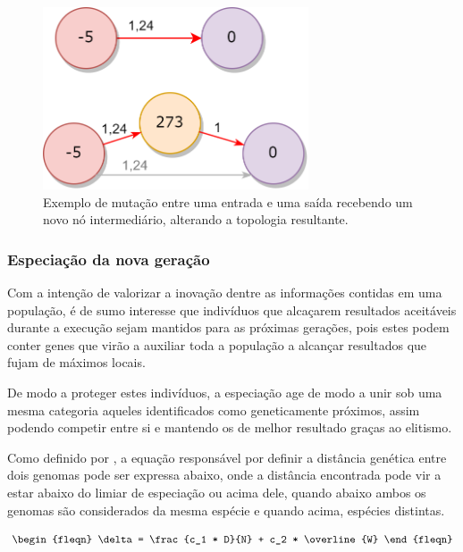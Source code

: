 \begin{figure}[htb]
        \centering
        \caption{\label{fig_MC}Exemplo de mutação entre uma entrada e uma saída recebendo um novo nó intermediário, alterando a topologia resultante.}
        \includegraphics[width=0.7\textwidth]{images/MC.png}
\end{figure}

\subsubsection{Especiação da nova geração}
Com a intenção de valorizar a inovação dentre as informações contidas em uma população, é de sumo interesse
que indivíduos que alcaçarem resultados aceitáveis durante a execução sejam mantidos para as próximas gerações,
pois estes podem conter genes que virão a auxiliar toda a população a alcançar resultados que fujam de máximos locais.

De modo a proteger estes indivíduos, a especiação age de modo a unir sob uma mesma categoria aqueles
identificados como geneticamente próximos, assim podendo competir entre si e mantendo os de melhor resultado graças ao elitismo.

Como definido por , a equação responsável por definir a
distância genética entre dois genomas pode ser expressa abaixo, onde a distância  encontrada
pode vir a estar abaixo do limiar de especiação ou acima dele, quando abaixo ambos os genomas
são considerados da mesma espécie e quando acima, espécies distintas.

\begin{equation}
\begin{fleqn}
\delta = \frac{c_1 * D}{N} + c_2 * \overline{W}
\end{fleqn}
\end{equation}

